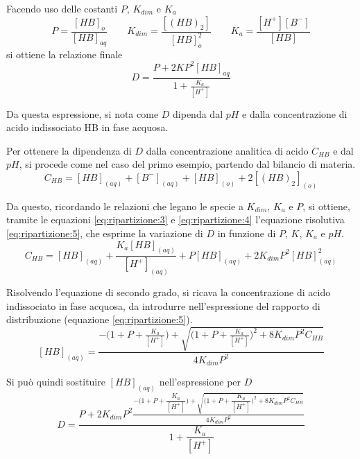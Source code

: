 Facendo uso delle costanti $P$, $K_{dim}$ e $K_a$
\[
P = \frac{[HB]_o}{[HB]_{aq}} \qquad K_{dim} = \frac{[(HB)_2]}{[HB]_o^2} \qquad K_a = \frac{[H^+] [B^-]}{[HB]}
\]
si ottiene la relazione finale
\[
D = \frac{P + 2 K P^2 [HB]_{aq}}{1 + \frac{K_a}{[H^+]}}
\]


Da questa espressione, si nota come $D$ dipenda dal $pH$ e dalla concentrazione di acido indissociato HB in fase acquosa.

Per ottenere la dipendenza di $D$ dalla concentrazione analitica di acido $C_{HB}$ e dal $pH$, si procede come nel caso del primo esempio, partendo dal bilancio di materia.
\[
C_{HB} = [HB]_{(aq)} + [B^-]_{(aq)} + [HB]_{(o)} + 2 [(HB)_2]_{(o)}
\]

Da questo, ricordando le relazioni che legano le specie a $K_{dim}$, $K_a$ e $P$, si ottiene, tramite le equazioni \ref{eq:ripartizione:3} e \ref{eq:ripartizione:4} l'equazione risolutiva \ref{eq:ripartizione:5}, che esprime la variazione di $D$ in funzione di $P$, $K$, $K_a$ e $pH$.
\begin{equation} \label{eq:ripartizione:3}
C_{HB} = [HB]_{(aq)} + \frac{K_a [HB]_{(aq)}}{[H^+]_{(aq)}} + P [HB]_{(aq)} + 2 K_{dim} P^2 [HB]_{(aq)}^2 
\end{equation}

Risolvendo l'equazione di secondo grado, si ricava la concentrazione di acido indissociato in fase acquosa, da introdurre nell'espressione del rapporto di distribuzione (equazione \ref{eq:ripartizione:5}).
\begin{equation} \label{eq:ripartizione:4}
[HB]_{(aq)} = \frac{-\biggl(1+P+\frac{K_a}{[H^+]}\biggr) + \sqrt{\biggl(1+P+\frac{K_a}{[H^+]}\biggr)^2 + 8K_{dim} P^2 C_{HB}}}{4 K_{dim} P^2}
\end{equation}

Si può quindi sostituire $[HB]_{(aq)}$ nell'espressione per $D$
\begin{equation} \label{eq:ripartizione:5}
D = \dfrac{P+2 K_{dim} P^2\frac{-\biggl(1 + P + \dfrac{K_a}{[H^+]}\biggr) + \sqrt{\biggl(1 + P + \dfrac{K_a}{[H^+]}\biggr)^2 + 8 K_{dim} P^2 C_{HB}}}{4K_{dim}P^2}}{1+\dfrac{K_a}{[H^+]}}
\end{equation}





